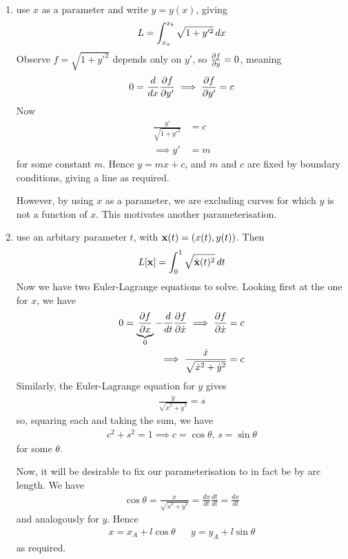 \documentclass{../template/note}
\begin{document}
    \begin{enumerate}[label=\protect\circled{\arabic*}]
        \item use $x$ as a parameter and write $y = y(x)$, giving
        \begin{align*}
            L = \int_{x_a}^{x_b} \sqrt{1+y'^2} \,d{x}
        \end{align*}
        Observe $f = \sqrt{1+y'^2}$ depends only on $y'$, so $\pd{f}{y} = 0$, meaning
        \begin{align*}
            0 = \frac{d}{dx} \pd{f}{y'} \implies \pd{f}{y'} = c
        \end{align*}
        Now
        \begin{align*}
            \frac{y'}{\sqrt{1+y'^2}} &= c \\
            \implies y' &= m
        \end{align*}
        for some constant $m$. Hence $y = mx + c$, and $m$ and $c$ are fixed by boundary conditions, giving a line as required.

        However, by using $x$ as a parameter, we are excluding curves for which $y$ is not a function of $x$. This motivates another parameterisation.

        \item use an arbitary parameter $t$, with $\V x(t) = (x(t), y(t))$. Then
        \begin{align*}
            L[\V x] = \int_0^1 \sqrt{\dot{\V x}(t)^2} \D t
        \end{align*}
        Now we have two Euler-Lagrange equations to solve. Looking first at the one for $x$, we have
        \begin{align*}
            0 = \underbrace{\pd{f}{x}}_0 - \frac{d}{dt} \pd{f}{\dot x} \implies \pd{f}{\dot x} &= c \\
            \implies \frac{\dot x}{\sqrt{\dot x^2 + \dot y^2}} &= c
        \end{align*}
        Similarly, the Euler-Lagrange equation for $y$ gives
        \begin{align*}
            \frac{\dot y}{\sqrt{\dot x^2 + \dot y^2}} = s
        \end{align*}
        so, squaring each and taking the sum, we have
        \begin{align*}
            c^2 + s^2 = 1 \implies c = \cos \theta, \, s = \sin \theta
        \end{align*}
        for some $\theta$.

        Now, it will be desirable to fix our parameterisation to in fact be by arc length. We have
        \begin{align*}
            \cos \theta = \frac{\dot x}{\sqrt{\dot x^2 + \dot y^2}} = \frac{dx}{dt} \frac{dt}{dl} = \frac{dx}{dl}
        \end{align*}
        and analogously for $y$. Hence
        \begin{align*}
            x = x_A + l \cos \theta && y = y_A + l \sin \theta
        \end{align*}
        as required.   
        

\end{enumerate}
\end{document}
